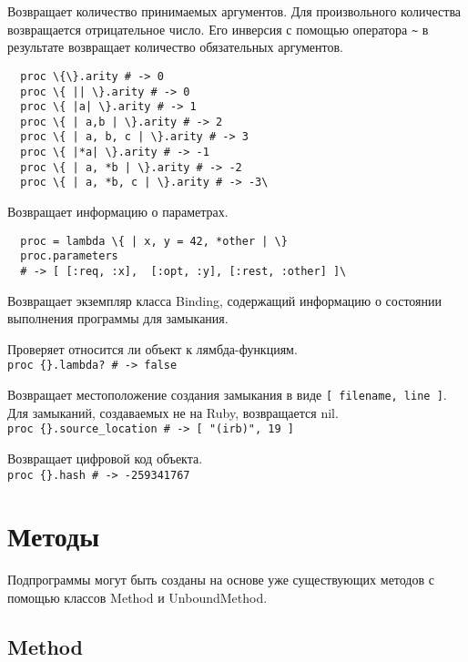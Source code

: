\begin{methodlist}
  Возвращает количество принимаемых аргументов. Для произвольного количества возвращается отрицательное число. Его инверсия с помощью оператора \verb!~! в результате возвращает количество обязательных аргументов.
  \begin{verbatim}
  proc \{\}.arity # -> 0 
  proc \{ || \}.arity # -> 0 
  proc \{ |a| \}.arity # -> 1 
  proc \{ | a,b | \}.arity # -> 2 
  proc \{ | a, b, c | \}.arity # -> 3 
  proc \{ |*a| \}.arity # -> -1 
  proc \{ | a, *b | \}.arity # -> -2 
  proc \{ | a, *b, c | \}.arity # -> -3\
  \end{verbatim} 
 
  Возвращает информацию о параметрах.
  \begin{verbatim}
  proc = lambda \{ | x, y = 42, *other | \} 
  proc.parameters
  # -> [ [:req, :x],  [:opt, :y], [:rest, :other] ]\
  \end{verbatim}

  Возвращает экземпляр класса Binding, содержащий информацию о состоянии выполнения программы для замыкания.

  \declare{.lambda?}{} 
  Проверяет относится ли объект к лямбда-функциям. 
  \\\verb!proc {}.lambda? # -> false!
 
  Возвращает местоположение создания замыкания в виде \verb![ filename, line ]!. Для замыканий, создаваемых не на Ruby, возвращается nil.
  \\\verb!proc {}.source_location # -> [ "(irb)", 19 ]!

  Возвращает цифровой код объекта. 
  \\\verb!proc {}.hash # -> -259341767!
\end{methodlist}

\section{Методы}

Подпрограммы могут быть созданы на основе уже существующих методов с помощью классов Method и UnboundMethod.

\subsection{Method}

